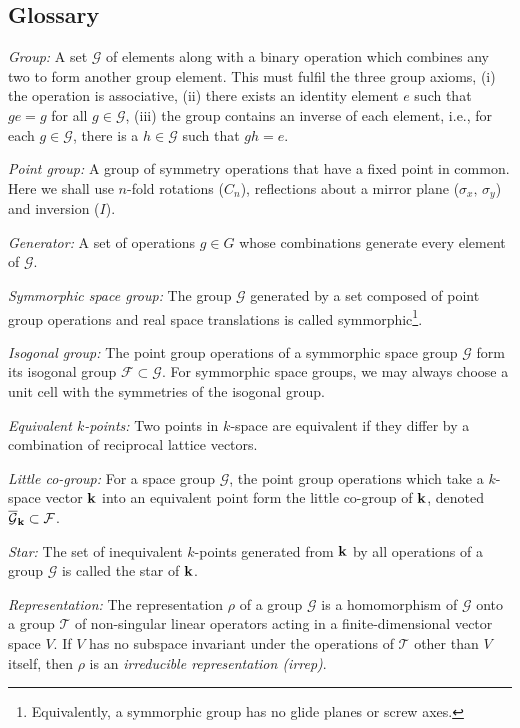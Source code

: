 \subsection{Glossary}

\textit{Group: } A set $\mathcal{G}$ of elements along with a binary operation which combines any two to form another group element. This must fulfil the three group axioms, (i) the operation is associative, (ii) there exists an identity element $e$ such that $g e = g$ for all $g \in \mathcal{G}$, (iii) the group contains an inverse of each element, i.e., for each $g \in \mathcal{G}$, there is a $h \in \mathcal{G}$ such that $g h = e$.  

\textit{Point group: } A group of symmetry operations that have a fixed point in common. Here we shall use $n$-fold rotations ($C_n$), reflections about a mirror plane ($\sigma_x, \, \sigma_y$) and inversion ($I$).

\textit{Generator:} A set of operations $g \in G$ whose combinations generate every element of $\mathcal{G}$. 

\textit{Symmorphic space group:} The group $\mathcal{G}$ generated by a set composed of point group operations and real space translations is called symmorphic\footnote{Equivalently, a symmorphic group has no glide planes or screw axes.}.

\textit{Isogonal group:} The point group operations of a symmorphic space group $\mathcal{G}$ form its isogonal group $\mathcal{F} \subset \mathcal{G}$. For symmorphic space groups, we may always choose a unit cell with the symmetries of the isogonal group.

\textit{Equivalent $k$-points:} Two points in $k$-space are equivalent if they differ by a combination of reciprocal lattice vectors.

\textit{Little co-group:} For a space group $\mathcal{G}$, the point group operations which take a $k$-space vector $\vb{k}$ into an equivalent point form the little co-group of $\vb{k}$, denoted ${{\overline{\mathcal{G}}}_{\vb{k}}} \subset \mathcal{F}$.

\textit{Star:} The set of inequivalent $k$-points generated from $\vb{k}$ by all operations of a group $\mathcal{G}$ is called the star of $\vb{k}$.

\textit{Representation:} The representation $\rho$ of a group $\mathcal{G}$ is a homomorphism of $\mathcal{G}$ onto a group $\mathcal{T}$ of non-singular linear operators acting in a finite-dimensional vector space $V$. If $V$ has no subspace invariant under the operations of $\mathcal{T}$ other than $V$ itself, then $\rho$ is an \textit{irreducible representation (irrep)}.

